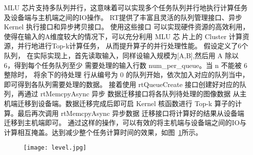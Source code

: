 MLU 芯片支持多队列并行，这意味着可以实现多个任务队列并行地执行计算任务及设备端与主机端之间的IO操作。
RT提供了丰富且灵活的队列管理接口、异步 Kernel 执行接口和异步拷贝接口。 使用这些接口
 可以实现硬件资源的高效利用，使得在输入的A维度较大的情况下，可以充分利用 MLU 芯
 片上的 Cluster 计算资源，并行地进行Top-k计算任务， 从而提升算子的并行处理性能。
 假设定义了6个队列，
在实际实现上，首先读取输入，同样设输入规模为[A,B],然后用 A 除以 6，得到每个任务队列至少
  需要处理的输入行数 num\_per\_queue。当 n 不能被 6 整除时， 将余下的待处理
  行从编号为 0 的队列开始，依次加入对应的队列当中，即可得到各队列需要处理的数据。
  接着使用 rtQueueCreate 接口创建好对应的队列，再通过 rtMemcpyAsync 异步
  数据迁移接口将各队列待处理的图像数据 从主机端迁移到设备端。数据迁移完成后即可启
   Kernel 核函数进行 Top-k 算子的计算。最后再次调用 rtMemcpyAsync 异步数据
   迁移接口将计算好的结果从设备端迁移到主机端即可。
通过这样的操作，可以有效的将主机端与设备端之间的IO与计算相互掩盖。达到减少整个任务计算时间的效果，如图~\ref{fig:level}所示。
\begin{figure}[ht]
    \centering
    \texttt{[image: level.jpg]}
    \caption{}
    \label{fig:level}
\end{figure}










